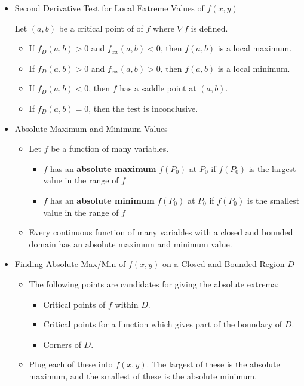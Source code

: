 \begin{itemize}
  \item Second Derivative Test for Local Extreme Values of $f(x,y)$

    Let $(a,b)$ be a critical point of of $f$ where $\nabla f$ is defined.
    \begin{itemize}
      \item If $f_D(a,b)>0$ and $f_{xx}(a,b)<0$, then $f(a,b)$ is a local maximum.
      \item If $f_D(a,b)>0$ and $f_{xx}(a,b)>0$, then $f(a,b)$ is a local minimum.
      \item If $f_D(a,b)<0$, then $f$ has a saddle point at $(a,b)$.
      \item If $f_D(a,b)=0$, then the test is inconclusive.
    \end{itemize}

  \newpage

  \item Absolute Maximum and Minimum Values
  
    \begin{itemize}
    \item Let $f$ be a function of many variables.
      \begin{itemize}
      \item $f$ has an \textbf{absolute maximum} $f(P_0)$ at $P_0$ if $f(P_0)$ is the largest value in the range of $f$
      \item $f$ has an \textbf{absolute minimum} $f(P_0)$ at $P_0$ if $f(P_0)$ is the smallest value in the range of $f$
      \end{itemize}
    \item Every continuous function of many variables with a closed and bounded domain has an absolute maximum and minimum value.
    \end{itemize}
    
  \item Finding Absolute Max/Min of $f(x,y)$ on a Closed and Bounded Region $D$
    \begin{itemize}
      \item The following points are candidates for giving the absolute extrema:
        \begin{itemize}
          \item Critical points of $f$ within $D$.
          \item Critical points for a function which gives part of the boundary of $D$.
          \item Corners of $D$.
        \end{itemize}
      \item Plug each of these into $f(x,y)$. The largest of these is the absolute maximum, and the smallest of these is the absolute minimum.
    \end{itemize}
    

\end{itemize}
